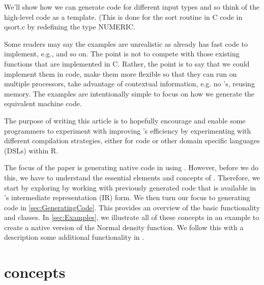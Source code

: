 We'll show how we can generate code for different input types
and so think of the high-level code as a template.
(This is done for the sort routine in C code in qsort.c by redefining the
type NUMERIC.


Some readers may say the examples are unrealistic as \R{} already has
fast code to implement, e.g.,  and so on.  The point is not
to compete with those existing functions that are implemented in
C. Rather, the point is to say that we could implement them in \R{}
code, make them more flexible so that they can run on multiple
processors, take advantage of contextual information, e.g. no \na's,
reusing memory. The examples are intentionally simple to focus on how
we generate the equivalent machine code.


The purpose of writing this article is to hopefully encourage and
enable some \R{} programmers to experiment with improving \R's
efficiency by experimenting with different compilation strategies,
either for \R{} code or other domain specific languages (DSLs) within
R.


\begin{comment}
We'll use examples from the ``Writing R extensions manual'' also used
in the \Rpkg{Rcpp}~\cite{bib:Rcpp} package to facilitate comparison.
\end{comment}


The focus of the paper is generating native code in \R{} using \llvm.
However, before we do this, we have to understand the essential
elements and concepts of \llvm.  Therefore, we start by exploring
\llvm{} by working with previously generated code that is available in
\llvm's intermediate representation (IR) form.  We then turn our focus
to generating code in \ref{sec:GeneratingCode}.  This provides an
overview of the basic functionality and classes.  In
\ref{sec:Examples}, we illustrate all of these concepts in an example
to create a native version of the Normal density function.
We follow this with a description some additional functionality
in .





\section[LLVM Concepts]{\llvm concepts}

